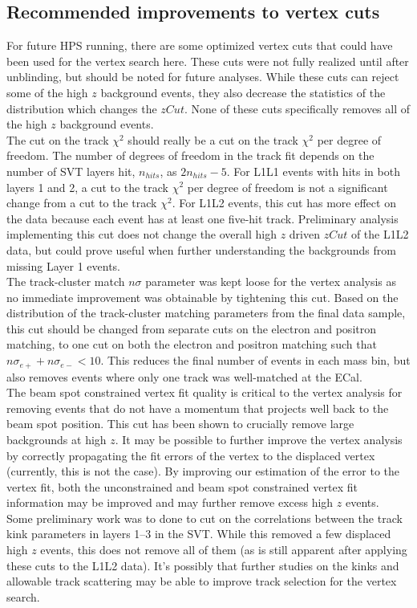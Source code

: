\subsection{Recommended improvements to vertex cuts}
For future HPS running, there are some optimized vertex cuts that could have been used for the vertex search here. These cuts were not fully realized until after unblinding, but should be noted for future analyses. While these cuts can reject some of the high $z$ background events, they also decrease the statistics of the distribution which changes the $zCut$. None of these cuts specifically removes all of the high $z$ background events. \\
\indent The cut on the track $\chi^2$ should really be a cut on the track $\chi^2$ per degree of freedom. The number of degrees of freedom in the track fit depends on the number of SVT layers hit, $n_{hits}$, as $2n_{hits}-5$. For L1L1 events with hits in both layers 1 and 2, a cut to the track $\chi^2$ per degree of freedom is not a significant change from a cut to the track $\chi^2$. For L1L2 events, this cut has more effect on the data because each event has at least one five-hit track. Preliminary analysis implementing this cut does not change the overall high $z$ driven $zCut$ of the L1L2 data, but could prove useful when further understanding the backgrounds from missing Layer 1 events. \\
\indent The track-cluster match $n\sigma$ parameter was kept loose for the vertex analysis as no immediate improvement was obtainable by tightening this cut. Based on the distribution of the track-cluster matching parameters from the final data sample, this cut should be changed from separate cuts on the electron and positron matching, to one cut on both the electron and positron matching such that $n\sigma_{e+}+n\sigma_{e-}<10$. This reduces the final number of events in each mass bin, but also removes events where only one track was well-matched at the ECal.\\
\indent  The beam spot constrained vertex fit quality is critical to the vertex analysis for removing events that do not have a momentum that projects well back to the beam spot position. This cut has been shown to crucially remove large backgrounds at high $z$. It may be possible to further improve the vertex analysis by correctly propagating the fit errors of the vertex to the displaced vertex (currently, this is not the case). By improving our estimation of the error to the vertex fit, both the unconstrained and beam spot constrained vertex fit information may be improved and may further remove excess high $z$ events. \\
\indent Some preliminary work was to done to cut on the correlations between the track kink parameters in layers 1--3 in the SVT. While this removed a few displaced high $z$ events, this does not remove all of them (as is still apparent after applying these cuts to the L1L2 data). It's possibly that further studies on the kinks and allowable track scattering may be able to improve track selection for the vertex search.